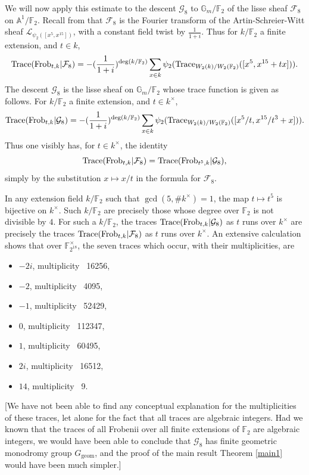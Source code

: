 \documentclass[11pt]{amsart}
\theoremstyle{plain}
\theoremstyle{definition}
\numberwithin{thm}{section}
\numberwithin{equation}{thm}
\newcommand{\Trace}{{\rm Trace}}
\newcommand{\sF}{{\mathcal F}}
\newcommand{\sG}{{\mathcal G}}
\newcommand{\sL}{{\mathcal L}}
\newcommand{\A}{{\mathbb A}}
\newcommand{\F}{{\mathbb F}}
\newcommand{\G}{{\mathbb G}}
\newcommand{\0}{\emptyset}
\newcommand{\geo}{{\mathrm {geom}}}
\newcommand{\Frob}{\mathrm{Frob}}
\begin{document}
We will now apply this estimate to the descent $\sG_8$ to $\G_m/\F_2$ of the lisse sheaf $\sF_8$ on $\A^1/\F_2$. Recall from \cite[\S2]{Ka-ERS} that $\sF_8$ is the Fourier transform of the Artin-Schreier-Witt sheaf $\sL_{\psi_2([x^{5},x^{15}])}$, with a constant field twist by $\frac{1}{1+i}$.
Thus for $k/\F_2$ a finite extension, and $t \in k$,
$$\Trace(\Frob_{t,k}|\sF_8)=-(\frac{1}{1+i})^{\deg(k/\F_2)}\sum_{x \in k}\psi_2(\Trace_{W_2(k)/W_2(\F_2)}([x^5,x^{15}+tx])).$$
The descent $\sG_8$ is the lisse sheaf on $\G_m/\F_2$ whose trace function is given as follows. For  $k/\F_2$ a finite extension, and $t \in k^\times$,
$$\Trace(\Frob_{t,k}|\sG_8)=-(\frac{1}{1+i})^{\deg(k/\F_2)}\sum_{x \in k}\psi_2(\Trace_{W_2(k)/W_2(\F_2)}([x^5/t,x^{15}/t^3+x])).$$
Thus one visibly has, for $t \in k^\times$, the identity
$$\Trace(\Frob_{t,k}|\sF_8)=\Trace(\Frob_{t^5,k}|\sG_8),$$
simply by the substitution $x \mapsto x/t$ in the formula for $\sF_8$.

In any extension field $k/\F_2$ such that $\gcd(5, \#k^\times)=1$, the map $t \mapsto t^5$ is bijective on $k^\times$. Such $k/\F_2$ are precisely those whose degree over $\F_2$ is not divisible by $4$. For such a $k/\F_2$,  the traces $\Trace(\Frob_{t,k}|\sG_8)$ as $t$ runs over $k^\times$ are precisely the traces $\Trace(\Frob_{t,k}|\sF_8)$ as $t$ runs over $k^\times$. An extensive 
calculation shows that over $\F_{2^{18}}^\times$, the seven traces which occur, with their multiplicities, are
\begin{itemize}
\item $-2i$, {\rm multiplicity\ } 16256,
\item $-2$, {\rm multiplicity\ } 4095,
\item $-1$, {\rm multiplicity\ } 52429,
\item $0$, {\rm multiplicity\ } 112347,
\item $1$, {\rm multiplicity\ } 60495,
\item $2i$, {\rm multiplicity\ } 16512,
\item $14$, {\rm multiplicity\ } 9.
\end{itemize}
[We have not been able to find any conceptual explanation for the multiplicities of these traces, let alone for the fact that all traces are algebraic integers. Had we known that the traces of all Frobenii over all finite extensions of $\F_2$ are algebraic integers, we would have been able to conclude that $\sG_8$ has finite geometric monodromy group $G_\geo$, and the proof of the main result Theorem \ref{main1} would have been much simpler.]
 
\end{document}
